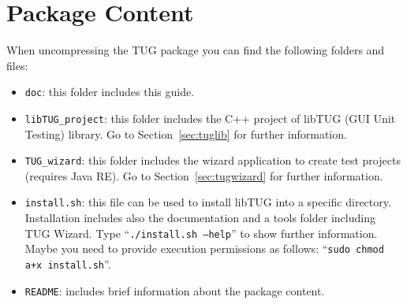 
\section{Package Content}

When uncompressing the TUG package you can find the following folders and
files:
%
\begin{itemize}
%
\item {\tt doc}: this folder includes this guide.
%
\item {\tt libTUG\_project}: this folder includes the C++ project of libTUG
  (GUI Unit Testing) library. Go to Section~\ref{sec:tuglib} for further
  information.
%
\item {\tt TUG\_wizard}: this folder includes the wizard application to
  create test projects (requires Java RE). Go to
  Section~\ref{sec:tugwizard} for further information.
%
\item {\tt install.sh}: this file can be used to install libTUG into a
  specific directory. Installation includes also the documentation and a
  tools folder including TUG Wizard. Type ``{\tt ./install.sh --help}'' to show
  further information. Maybe you need to provide execution permissions as
  follows: ``{\tt sudo chmod a+x install.sh}''.
%
\item {\tt README}: includes brief information about the package content.
%
\end{itemize}


